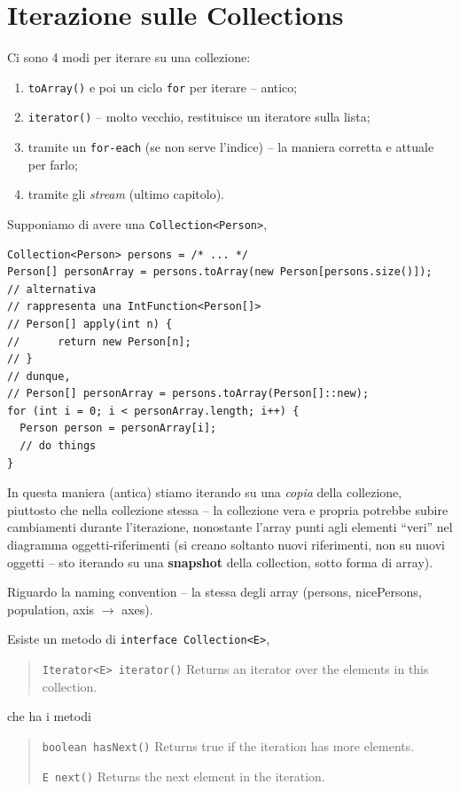 \documentclass[\fontsizeclass,twocolumn]{\classname}
\theoremstyle{definition}
\theoremstyle{definition}
\begin{document}
\section{Iterazione sulle Collections}

Ci sono 4 modi per iterare su una collezione:
\begin{enumerate}
    \item \texttt{toArray()} e poi un ciclo \texttt{for} per iterare -- antico;
    \item \texttt{iterator()} -- molto vecchio, restituisce un iteratore sulla
        lista;
    \item tramite un \texttt{for-each} (se non serve l'indice) -- la maniera
        corretta e attuale per farlo;
    \item tramite gli \emph{stream} (ultimo capitolo).
\end{enumerate}

Supponiamo di avere una \texttt{Collection<Person>},

\begin{lstlisting}
Collection<Person> persons = /* ... */
Person[] personArray = persons.toArray(new Person[persons.size()]);
// alternativa
// rappresenta una IntFunction<Person[]>
// Person[] apply(int n) {
//      return new Person[n];
// }
// dunque,
// Person[] personArray = persons.toArray(Person[]::new);
for (int i = 0; i < personArray.length; i++) {
  Person person = personArray[i];
  // do things
}
\end{lstlisting}

In questa maniera (antica) stiamo iterando su una \emph{copia} della
collezione, piuttosto che nella collezione stessa -- la collezione vera e
propria potrebbe subire cambiamenti durante l'iterazione, nonostante l'array
punti agli elementi ``veri'' nel diagramma oggetti\--riferimenti (si creano
soltanto nuovi riferimenti, non su nuovi oggetti -- sto iterando su una
\textbf{snapshot} della collection, sotto forma di array).

Riguardo la naming convention -- la stessa degli array (persons, nicePersons,
population, axis $\rightarrow$ axes).

Esiste un metodo di \texttt{interface Collection<E>},

\begin{quote}
    \footnotesize{\texttt{Iterator<E>	iterator()}	Returns an iterator over the elements in this collection.}
\end{quote}

che ha i metodi
\begin{quote}
    \footnotesize{\texttt{boolean	hasNext()}	Returns true if the iteration has more elements.

        \texttt{E	next()}	Returns the next element in the iteration.
}
\end{quote}
\end{document}
